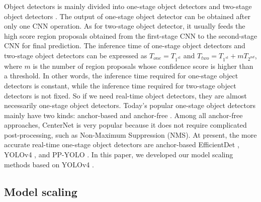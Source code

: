 \documentclass[10pt,twocolumn,letterpaper]{article}
\begin{document}
Object detectors is mainly divided into one-stage object detectors \cite{redmon2016you, redmon2017yolo9000, redmon2018yolov3, liu2016ssd, lin2017focal, qiao2020detectors} and two-stage object detectors \cite{girshick2014rich, girshick2015fast, ren2015faster}.  The output of one-stage object detector can be obtained after only one CNN operation.  As for two-stage object detector, it usually feeds the high score region proposals obtained from the first-stage CNN to the second-stage CNN for final prediction.  The inference time of one-stage object detectors and two-stage object detectors can be expressed as ${T}_{one} = {T}_{{1}^{st}}$ and ${T}_{two} = {T}_{{1}^{st}} + m{T}_{{2}^{nd}}$, where $m$ is the number of region proposals whose confidence score is higher than a threshold.  In other words, the inference time required for one-stage object detectors is constant, while the inference time required for two-stage object detectors is not fixed.  So if we need real-time object detectors, they are almost necessarily one-stage object detectors.  Today’s popular one-stage object detectors mainly have two kinds: anchor-based \cite{redmon2018yolov3, lin2017focal} and anchor-free \cite{duan2019centernet, law2018cornernet, law2019cornernet, tian2019fcos}.  Among all anchor-free approaches, CenterNet \cite{zhou2019objects} is very popular because it does not require complicated post-processing, such as Non-Maximum Suppression (NMS).  At present, the more accurate real-time one-stage object detectors are anchor-based EfficientDet \cite{tan2019efficientdet}, YOLOv4 \cite{bochkovskiy2020yolov4}, and PP-YOLO \cite{long2020pp}.  In this paper, we developed our model scaling methods based on YOLOv4 \cite{bochkovskiy2020yolov4}.

\subsection{Model scaling}
\end{document}
